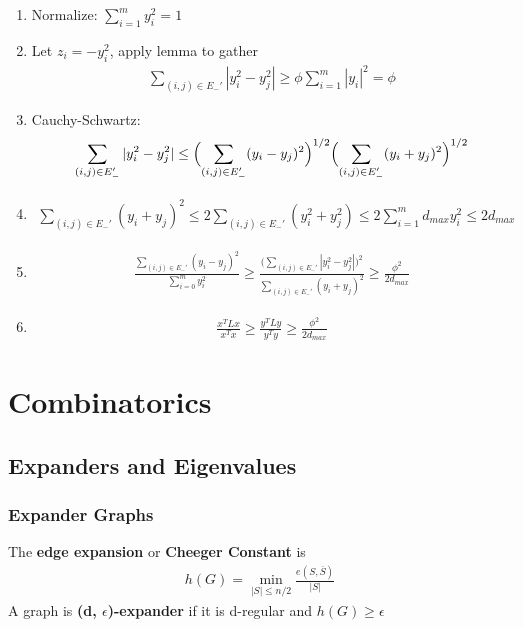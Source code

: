 \documentclass[12pt, letterpaper]{report}
\begin{document}
    \begin{enumerate}
        \item Normalize: $\sum_{i=1}^m y_i^2 =1$
        \item Let $z_i=-y_i^2$, apply lemma to gather\begin{gather*}
            \sum_{(i,j)\in E_{-}'}|y_i^2-y_j^2|\geq \phi \sum_{i=1}^{m}|y_i|^2=\phi
        \end{gather*}
        \item Cauchy-Schwartz:\begin{gather*}
            \sum_{(i,j)\in E_{-}'}|y_i^2-y_j^2|\leq \Bigl( \sum_{(i,j)\in E_{-}'}(y_i-y_j)^2 \Bigr) ^{1/2}\Bigl(\sum_{(i,j)\in E_{-}'} (y_i+y_j)^2\Bigr)^{1/2}
        \end{gather*}
        \item \begin{gather*}
            \sum_{(i,j)\in E_{-}'}(y_i+y_j)^2 \leq 2\sum_{(i,j)\in E_{-}'}(y_i^2+y_j^2)\leq 2\sum_{i=1}^{m}d_{max}y_i^2\leq 2d_{max}
        \end{gather*}
        \item \begin{gather*}
            \frac{\sum_{(i,j)\in E_{-}'}(y_i-y_j)^2}{\sum_{i=0}^m y_i^2}\geq\frac{\bigl(\sum_{(i,j)\in E_{-}'}|y_i^2-y_j^2|\bigr)^2}{\sum_{(i,j)\in E_{-}'}(y_i+y_j)^2}\geq\frac{\phi^2}{2d_{max}}
        \end{gather*}
        \item \begin{gather*}
            \frac{x^TLx}{x^Tx}\geq\frac{y^TLy}{y^Ty}\geq\frac{\phi^2}{2d_{max}}
        \end{gather*}
    \end{enumerate}
    

    \newpage
    \chapter{Combinatorics}
    \section{Expanders and Eigenvalues}
    \subsection{Expander Graphs}
    The \textbf{edge expansion} or \textbf{Cheeger Constant} is
    \begin{gather}
        h(G) = \min_{|S|\leq n/2} \frac{e(S,\overline{S})}{|S|}
    \end{gather}
    A graph is \textbf{(d, $\epsilon$)-expander} if it is d-regular and $h(G)\geq \epsilon$
\end{document}
